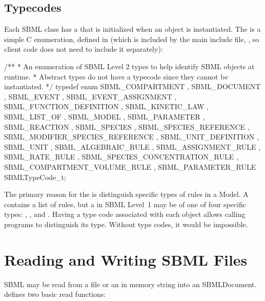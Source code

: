 \documentclass{sbmlmanual}
\begin{document}
\subsection{Typecodes}
\label{sec:typecodes}

Each SBML class has a  that is initialized when
an object is instantiated.  The  is a simple C
enumeration, defined in  (which is included by the
main \libsbml{} include file, , so client code does not
need to include it separately):

\begin{cVerbatim}
  /**
   * An enumeration of SBML Level 2 types to help identify SBML objects at runtime.
   * Abstract types do not have a typecode since they cannot be instantiated.
   */
  typedef enum
  {
      SBML_COMPARTMENT
    , SBML_DOCUMENT
    , SBML_EVENT
    , SBML_EVENT_ASSIGNMENT
    , SBML_FUNCTION_DEFINITION
    , SBML_KINETIC_LAW
    , SBML_LIST_OF
    , SBML_MODEL
    , SBML_PARAMETER
    , SBML_REACTION
    , SBML_SPECIES
    , SBML_SPECIES_REFERENCE
    , SBML_MODIFIER_SPECIES_REFERENCE
    , SBML_UNIT_DEFINITION
    , SBML_UNIT
    , SBML_ALGEBRAIC_RULE
    , SBML_ASSIGNMENT_RULE
    , SBML_RATE_RULE
    , SBML_SPECIES_CONCENTRATION_RULE
    , SBML_COMPARTMENT_VOLUME_RULE
    , SBML_PARAMETER_RULE
  } SBMLTypeCode_t;
\end{cVerbatim}

The primary reason for the  is distinguish specific
types of rules in a Model.  A  contains a list of rules,
but a  in SBML Level~1 may be of one of four specific types:
, ,
 and .  Having a type
code associated with each object allows calling programs to distinguish its
type.  Without type codes, it would be impossible.


\section{Reading and Writing SBML Files}
\label{sec:reading-sbml}

SBML may be read from a file or an in memory string into an
SBMLDocument.  \libsbml{} defines two basic read functions:
\end{document}
